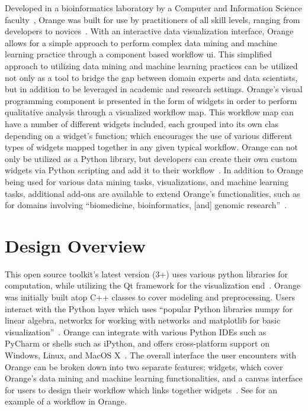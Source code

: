 Developed in a bioinformatics laboratory by a Computer and Information
Science faculty~\cite{hid-sp18-504-predanalytics}, Orange was built for
use by practitioners of all skill levels, ranging from developers to
novices~\cite{hid-sp18-504-predanalytics}.
With an interactive data visualization interface, Orange allows for
a simple approach to perform complex data mining and machine learning
practice through a component based workflow ui. This simplified approach
to utilizing data mining and machine learning practices can be utilized
not only as a tool to bridge the gap between domain experts and data
scientists, but in addition to be leveraged in academic and
research settings. Orange’s visual programming component is presented in
the form of widgets in order to perform qualitative analysis through a
visualized workflow map. This workflow map can have a number of different
widgets included, each grouped into its own clas depending on a widget's
function; which encourages the use of various different types of
widgets mapped together in any given typical workflow. Orange can not only
be utilized as a Python library, but developers can create their own custom
widgets via Python scripting and add it to
their workflow~\cite{hid-sp18-504-orange}.
In addition to Orange being used for various data mining tasks, visualizations,
and machine learning tasks, additional add-ons are available to extend Orange's
functionalities, such as for domains involving ``biomedicine, bioinformatics,
[and] genomic research''~\cite{hid-sp18-504-wiki-orange}.

\section{Design Overview}

This open source toolkit's latest version (3+) uses various python libraries
for computation, while utilizing the Qt framework for the visualization
end~\cite{hid-sp18-504-wiki-orange}.
Orange was initially built atop C++ classes to cover
modeling and preprocessing.
Users interact with the Python layer which uses
``popular Python libraries numpy for linear algebra,
networkx for working with networks and matplotlib for
basic visualization''~\cite{hid-sp18-504-journalorange}.
Orange can integrate with various Python IDEs such as PyCharm or shells such as
iPython, and offers cross-platform support on Windows, Linux, and
MacOS X~\cite{hid-sp18-504-predanalytics}.
The overall interface the user encounters with Orange can be broken down
into two separate features; widgets, which cover Orange’s data mining and
machine learning functionalities, and a canvas interface for users to design
their workflow which links together widgets~\cite{hid-sp18-504-wiki-orange}.
See\label{f:fig1} for an example of a workflow in Orange.

